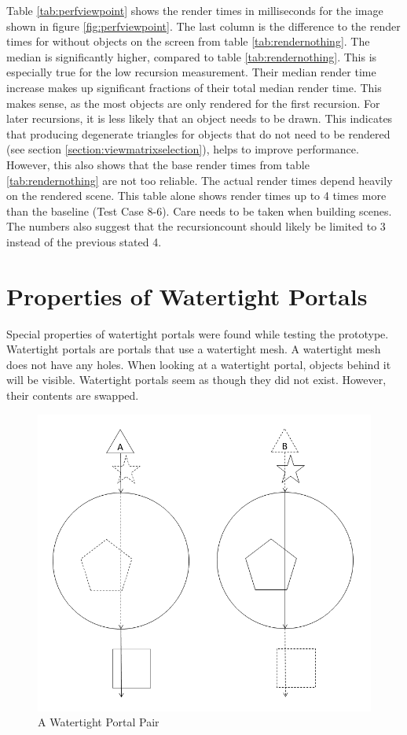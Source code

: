 Table \ref{tab:perfviewpoint} shows the render times in milliseconds for the image shown in figure \ref{fig:perfviewpoint}. The last column is the difference to the render times for without objects on the screen from table \ref{tab:rendernothing}. The median is significantly higher, compared to table \ref{tab:rendernothing}. This is especially true for the low recursion measurement. Their median render time increase makes up significant fractions of their total median render time. This makes sense, as the most objects are only rendered for the first recursion. For later recursions, it is less likely that an object needs to be drawn. This indicates that producing degenerate triangles for objects that do not need to be rendered (see section \ref{section:viewmatrixselection}), helps to improve performance. However, this also shows that the base render times from table \ref{tab:rendernothing} are not too reliable. The actual render times depend heavily on the rendered scene. This table alone shows render times up to 4 times more than the baseline (Test Case 8-6). Care needs to be taken when building scenes. The numbers also suggest that the \gls{recursioncount} should likely be limited to 3 instead of the previous stated 4.


\section{Properties of Watertight Portals}
\label{section:watertight}
Special properties of watertight portals were found while testing the prototype. Watertight portals are portals that use a watertight mesh. A watertight mesh does not have any holes. When looking at a watertight portal, objects behind it will be visible. Watertight portals seem as though they did not exist. However, their contents are swapped.

\begin{figure}[h]
	\centering
	\includegraphics[width=0.8\linewidth]{images/watertight.png}
	\caption{A Watertight Portal Pair}
	\label{fig:watertightportals}
\end{figure}

